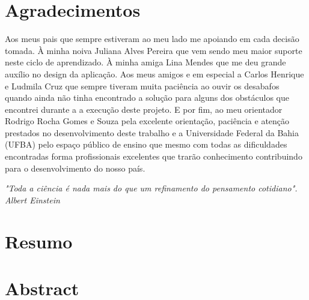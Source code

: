 \documentclass[12pt, a4paper]{report}
\begin{document}
\newpage
\chapter*{Agradecimentos}
\thispagestyle{empty}
\par Aos meus pais que sempre estiveram ao meu lado me apoiando em cada decisão tomada. À minha noiva Juliana Alves Pereira que vem sendo meu maior suporte neste ciclo de aprendizado. À minha amiga Lina Mendes que me deu grande auxílio no design da aplicação. Aos meus amigos e em especial a Carlos Henrique e Ludmila Cruz que sempre tiveram muita paciência ao ouvir os desabafos quando ainda não tinha encontrado a solução para alguns dos obstáculos que encontrei durante a a execução deste projeto. E por fim, ao meu orientador Rodrigo Rocha Gomes e Souza pela excelente orientação, paciência e atenção prestados no desenvolvimento deste trabalho e a Universidade Federal da Bahia (UFBA) pelo espaço público de ensino que mesmo com todas as dificuldades encontradas forma profissionais excelentes que trarão conhecimento contribuindo para o desenvolvimento do nosso país.  

\newpage
\vspace*{20cm}
\begin{flushright}
\begin{minipage}{7cm}
\begin{flushright}
\textit{
"Toda a ciência é nada mais do que um refinamento do pensamento cotidiano". \\
Albert Einstein}
\end{flushright}
\end{minipage}
\end{flushright}


\newpage
\chapter*{Resumo}
\thispagestyle{empty}


\newpage
\chapter*{Abstract}
\thispagestyle{empty}

\newpage
\tableofcontents
\thispagestyle{empty}

\end{document}
